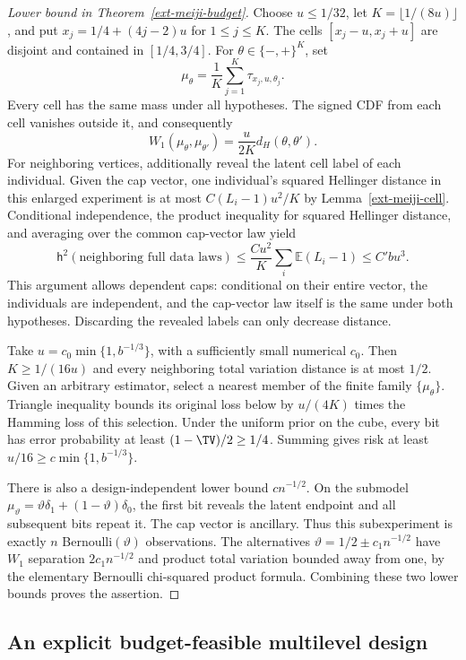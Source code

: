 \documentclass[11pt,a4paper]{article}
\theoremstyle{definition}\newtheorem{definition}[theorem]{Definition}
\theoremstyle{remark}\newtheorem{remark}[theorem]{Remark}
\newcommand{\E}{\mathbb E}\newcommand{\one}{\mathbf 1}\newcommand{\1}{\mathbf 1}
\numberwithin{equation}{section}
\begin{document}
\begin{proof}[Lower bound in Theorem~\ref{ext-meiji-budget}]
Choose $u\le1/32$, let $K=\lfloor1/(8u)\rfloor$, and put
$x_j=1/4+(4j-2)u$ for $1\le j\le K$. The cells
$[x_j-u,x_j+u]$ are disjoint and contained in $[1/4,3/4]$. For
$\theta\in\{-,+\}^K$, set
\[
 \mu_\theta=\frac1K\sum_{j=1}^K\tau_{x_j,u,\theta_j}.
\]
Every cell has the same mass under all hypotheses. The signed CDF from
each cell vanishes outside it, and consequently
\[
 W_1(\mu_\theta,\mu_{\theta'})
       =\frac{u}{2K}d_H(\theta,\theta').
\]
For neighboring vertices, additionally reveal the latent cell label of
each individual. Given the cap vector, one individual's squared
Hellinger distance in this enlarged experiment is at most
$C(L_i-1)u^2/K$ by Lemma~\ref{ext-meiji-cell}. Conditional independence,
the product inequality for squared Hellinger distance, and averaging over
the common cap-vector law yield
\[
 \mathsf h^2(\text{neighboring full data laws})
 \le \frac{Cu^2}{K}\sum_i\E(L_i-1)
 \le C'b u^3.
\]
This argument allows dependent caps: conditional on their entire vector,
the individuals are independent, and the cap-vector law itself is the
same under both hypotheses. Discarding the revealed labels can only
decrease distance.

Take $u=c_0\min\{1,b^{-1/3}\}$, with a sufficiently small numerical
$c_0$. Then $K\ge1/(16u)$ and every neighboring total variation distance
is at most $1/2$. Given an arbitrary estimator, select a nearest member
of the finite family $\{\mu_\theta\}$. Triangle inequality bounds its
original loss below by $u/(4K)$ times the Hamming loss of this selection.
Under the uniform prior on the cube, every bit has error probability at
least $(1-\TV)/2\ge1/4$. Summing gives risk at least
$u/16\ge c\min\{1,b^{-1/3}\}$.

There is also a design-independent lower bound $c n^{-1/2}$. On the
submodel $\mu_\vartheta=\vartheta\delta_1+(1-\vartheta)\delta_0$, the first
bit reveals the latent endpoint and all subsequent bits repeat it. The
cap vector is ancillary. Thus this subexperiment is exactly $n$
Bernoulli$(\vartheta)$ observations. The alternatives
$\vartheta=1/2\pm c_1n^{-1/2}$ have $W_1$ separation $2c_1n^{-1/2}$ and
product total variation bounded away from one, by the elementary
Bernoulli chi-squared product formula. Combining these two lower bounds
proves the assertion.
\end{proof}

\subsection{An explicit budget-feasible multilevel design}
\end{document}
